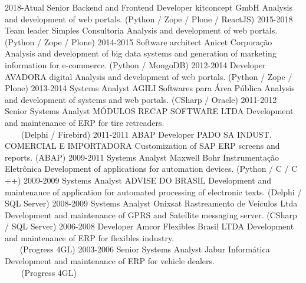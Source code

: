 \documentclass[]{twentysecondcv_en}
\begin{document}
\begin{twenty}
  \twentyitem
    {2018-Atual}
    {Senior Backend and Frontend Developer}
    {kitconcept GmbH}
    {Analysis and development of web portals. (Python / Zope / Plone / ReactJS)}
  \twentyitem
    {2015-2018}
    {Team leader}
    {Simples Consultoria}
    {Analysis and development of web portals. (Python / Zope / Plone)}
  \twentyitem
    {2014-2015}
    {Software architect}
    {Anicet Corporação}
    {Analysis and development of big data systems and generation of marketing information for e-commerce. (Python / MongoDB)}
  \twentyitem
    {2012-2014}
    {Developer}
    {AVADORA digital}
    {Analysis and development of web portals. (Python / Zope / Plone)}
  \twentyitem
    {2013-2014}
    {Systems Analyst}
    {AGILI Softwares para Área Pública}
    {Analysis and development of systems and web portals. (CSharp / Oracle)}
  \twentyitem
    {2011-2012}
    {Senior Systems Analyst}
    {MÓDULOS RECAP SOFTWARE LTDA}
    {Development and maintenance of ERP for tire retreaders. \\
    (Delphi / Firebird)}
  \twentyitem
    {2011-2011}
    {ABAP Developer}
    {PADO SA INDUST. COMERCIAL E IMPORTADORA}
    {Customization of SAP ERP screens and reports. (ABAP)}
  \twentyitem
    {2009-2011}
    {Systems Analyst}
    {Maxwell Bohr Instrumentação Eletrônica}
    {Development of applications for automation devices. (Python / C / C ++)}
  \twentyitem
    {2009-2009}
    {Systems Analyst}
    {ADVISE DO BRASIL}
    {Development and maintenance of application for automated processing of electronic texts. (Delphi / SQL Server)}
  \twentyitem
    {2008-2009}
    {Systems Analyst}
    {Onixsat Rastreamento de Veículos Ltda}
    {Development and maintenance of GPRS and Satellite messaging server. (CSharp / SQL Server)}
  \twentyitem
    {2006-2008}
    {Developer}
    {Amcor Flexibles Brasil LTDA}
    {Development and maintenance of ERP for flexibles industry. \\
    (Progress 4GL)}
  \twentyitem
    {2003-2006}
    {Senior Systems Analyst}
    {Jabur Informática}
    {Development and maintenance of ERP for vehicle dealers. \\
    (Progress 4GL)}
\end{twenty}
\end{document}
